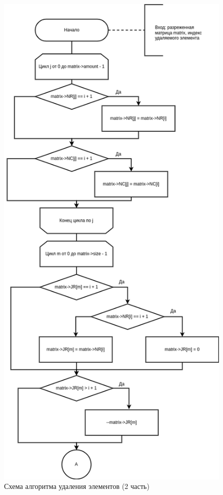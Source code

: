 \begin{figure}[H]
	\begin{center}
		\includegraphics[scale=0.51]{img/deletion2.png}
	\end{center}
	\captionsetup{justification=centering}
	\caption{Схема алгоритма удаления элементов (2 часть)}
	\label{img:deletion2}
\end{figure}

